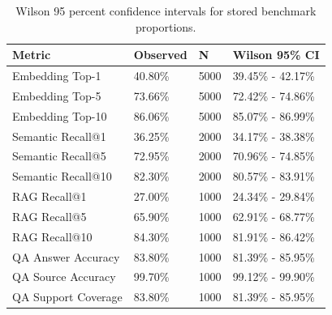 \begin{table}[ht]
\centering
\caption{Wilson 95 percent confidence intervals for stored benchmark proportions.}
\label{tab:confidence\_intervals}
\begin{tabular}{llll}
\hline
Metric & Observed & N & Wilson 95\% CI \\
\hline
Embedding Top-1 & 40.80\% & 5000 & 39.45\% - 42.17\% \\
Embedding Top-5 & 73.66\% & 5000 & 72.42\% - 74.86\% \\
Embedding Top-10 & 86.06\% & 5000 & 85.07\% - 86.99\% \\
Semantic Recall@1 & 36.25\% & 2000 & 34.17\% - 38.38\% \\
Semantic Recall@5 & 72.95\% & 2000 & 70.96\% - 74.85\% \\
Semantic Recall@10 & 82.30\% & 2000 & 80.57\% - 83.91\% \\
RAG Recall@1 & 27.00\% & 1000 & 24.34\% - 29.84\% \\
RAG Recall@5 & 65.90\% & 1000 & 62.91\% - 68.77\% \\
RAG Recall@10 & 84.30\% & 1000 & 81.91\% - 86.42\% \\
QA Answer Accuracy & 83.80\% & 1000 & 81.39\% - 85.95\% \\
QA Source Accuracy & 99.70\% & 1000 & 99.12\% - 99.90\% \\
QA Support Coverage & 83.80\% & 1000 & 81.39\% - 85.95\% \\
\hline
\end{tabular}
\end{table}
